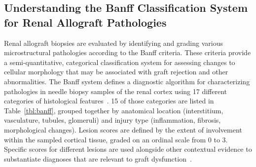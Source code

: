 \subsection{Understanding the Banff Classification System for Renal Allograft Pathologies}


Renal allograft biopsies are evaluated by identifying and grading various microstructural pathologies according to the Banff criteria. These criteria provide a semi-quantitative, categorical classification system for assessing changes to cellular morphology that may be associated with graft rejection and other abnormalities. The Banff system defines a diagnostic algorithm for characterizing pathologies in needle biopsy samples of the renal cortex using 17 different categories of histological features~\cite{loupy_Banff_2020}. 15 of those categories are listed in Table~\ref{tbl:banff}, grouped together by anatomical location (interstitium, vasculature, tubules, glomeruli) and injury type (inflammation, fibrosis, morphological changes). Lesion scores are defined by the extent of involvement within the sampled cortical tissue, graded on an ordinal scale from 0 to 3. Specific scores for different lesions are used alongside other contextual evidence to substantiate diagnoses that are relevant to graft dysfunction~\cite{boor_Renal_2015}.

